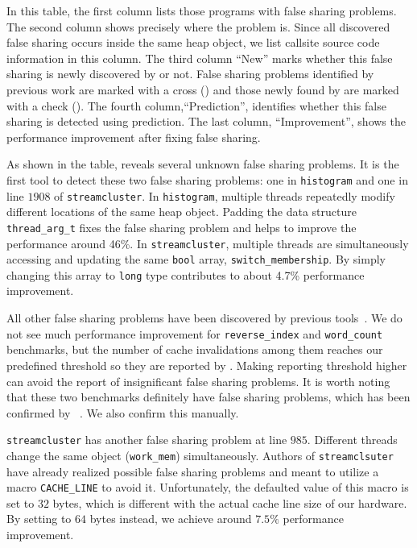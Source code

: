 In this table, the first column lists those programs with false sharing problems. 
The second column shows precisely where the problem is. Since all discovered false sharing 
occurs inside the same heap object, we list callsite source code information in this column.
The third column ``New'' marks whether this false sharing is newly discovered by \Predator{} or not.
False sharing problems identified by previous work are marked with a cross (\xmark{}) and those 
newly found by \Predator{} are marked with a check (\cmark{}).
The fourth column,``Prediction'', identifies whether this false sharing is detected using prediction.
The last column, ``Improvement'', shows the performance improvement after fixing false sharing. 

As shown in the table, \Predator{} reveals several unknown false sharing problems. 
It is the first tool to detect these two false sharing problems: one in \texttt{histogram} 
and one in line $1908$ of \texttt{streamcluster}. 
In \texttt{histogram}, multiple threads repeatedly modify different locations of the same heap object. 
Padding the data structure \texttt{thread\_arg\_t} fixes the false sharing problem and 
helps to improve the performance around 46\%.
In \texttt{streamcluster}, multiple threads are simultaneously accessing and updating 
the same \texttt{bool} array, \texttt{switch\_membership}. 
By simply changing this array to \texttt{long} type contributes to about 4.7\% performance improvement.

All other false sharing problems have been discovered by previous tools~\cite{sheriff}.
We do not see much performance improvement for \texttt{reverse\_index} and 
\texttt{word\_count} benchmarks, but the number of cache invalidations 
among them reaches our predefined threshold so they are reported by \predator{}.
Making reporting threshold higher can avoid the report of insignificant false sharing problems.
It is worth noting that these two benchmarks definitely have false sharing problems,
which has been confirmed by \Sheriff~\cite{sheriff}. 
We also confirm this manually. 

\texttt{streamcluster} has another false sharing problem at line $985$. 
Different threads change the same object (\texttt{work\_mem}) simultaneously. 
Authors of \texttt{streamclsuter} have already realized possible
false sharing problems and meant to utilize a macro \texttt{CACHE\_LINE} to avoid it. Unfortunately,
the defaulted value of this macro is set to $32$ bytes, which is different with the actual
cache line size of our hardware. By setting to $64$ bytes instead, we achieve around $7.5\%$ performance
improvement.

